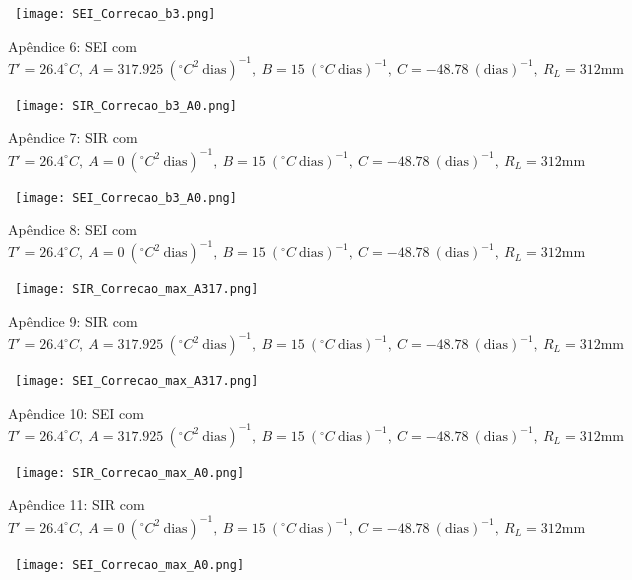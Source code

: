 \documentclass[
	12pt,				%
	oneside,			%
	a4paper,			%
	english,			%
	brazil				%
	]{abntex2}
\begin{document}
\begin{apendicesenv}
\begin{figure}[!ht]
	\centering
	\hbox{\hspace{2.4em} \texttt{[image: SEI\_Correcao\_b3.png]}}
	\caption*{Apêndice 6: SEI com $T'=26.4^\circ C, \ A=317.925 \ (^\circ C^2 \ \text{dias})^{-1}, \ B=15 \ (^\circ C \ \text{dias})^{-1}, \ C=-48.78 \ (\text{dias})^{-1}, \ R_L=312 \text{mm}$}
\end{figure}
\newpage
\begin{figure}[!ht]
	\centering
	\hbox{\hspace{2.5em} \texttt{[image: SIR\_Correcao\_b3\_A0.png]}}
	\caption*{Apêndice 7: SIR com $T'=26.4^\circ C, \ A=0 \ (^\circ C^2 \ \text{dias})^{-1}, \ B=15 \ (^\circ C \ \text{dias})^{-1}, \ C=-48.78 \ (\text{dias})^{-1}, \ R_L=312 \text{mm}$}
\end{figure} 
\begin{figure}[!ht]
	\centering
	\hbox{\hspace{2.0em} \texttt{[image: SEI\_Correcao\_b3\_A0.png]}}
	\caption*{Apêndice 8: SEI com $T'=26.4^\circ C, \ A=0 \ (^\circ C^2 \ \text{dias})^{-1}, \ B=15 \ (^\circ C \ \text{dias})^{-1}, \ C=-48.78 \ (\text{dias})^{-1}, \ R_L=312 \text{mm}$}
\end{figure}
\newpage
\begin{figure}[!ht]
	\centering
	\hbox{\hspace{4.0em} \texttt{[image: SIR\_Correcao\_max\_A317.png]}}
	\caption*{Apêndice 9: SIR com $T'=26.4^\circ C, \ A=317.925 \ (^\circ C^2 \ \text{dias})^{-1}, \ B=15 \ (^\circ C \ \text{dias})^{-1}, \ C=-48.78 \ (\text{dias})^{-1}, \ R_L=312 \text{mm}$}
\end{figure} 
\begin{figure}[!ht]
	\centering
	\hbox{\hspace{3.5em} \texttt{[image: SEI\_Correcao\_max\_A317.png]}}
	\caption*{Apêndice 10: SEI com $T'=26.4^\circ C, \ A=317.925 \ (^\circ C^2 \ \text{dias})^{-1}, \ B=15 \ (^\circ C \ \text{dias})^{-1}, \ C=-48.78 \ (\text{dias})^{-1}, \ R_L=312 \text{mm}$}
\end{figure}
\newpage
\begin{figure}[!ht]
	\centering
	\hbox{\hspace{3.8em} \texttt{[image: SIR\_Correcao\_max\_A0.png]}}
	\caption*{Apêndice 11: SIR com $T'=26.4^\circ C, \ A=0 \ (^\circ C^2 \ \text{dias})^{-1}, \ B=15 \ (^\circ C \ \text{dias})^{-1}, \ C=-48.78 \ (\text{dias})^{-1}, \ R_L=312 \text{mm}$}
\end{figure} 
\begin{figure}[!ht]
	\centering
	\hbox{\hspace{3.5em} \texttt{[image: SEI\_Correcao\_max\_A0.png]}}

\end{figure}
\end{apendicesenv}
\end{document}
